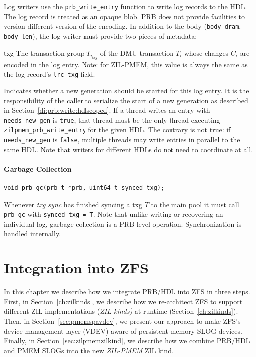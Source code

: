 \documentclass[12pt,a4paper,twoside]{book}
\begin{document}
Log writers use the \lstinline{prb_write_entry} function to write log records to the HDL.
The log record is treated as an opaque blob.
PRB does not provide facilities to version different version of the encoding.
In addition to the body (\lstinline{body_dram}, \lstinline{body_len}), the log writer must provide two pieces of metadata:
\begin{description}[noitemsep,leftmargin=1.5cm,labelindent=1cm]
    \item[txg] The transaction group $T_{i_{txg}}$ of the DMU transaction $T_i$ whose changes $C_i$ are encoded in the log entry.
        Note: for ZIL-PMEM, this value is always the same as the log record's \lstinline{lrc_txg} field.
    \item[needs\_new\_gen] Indicates whether a new generation should be started for this log entry.
        It is the responsibility of the caller to serialize the start of a new generation as described in Section~\ref{di:prb:write:hdlscoped}.
        If a thread writes an entry with \lstinline{needs_new_gen} is \lstinline{true}, that thread must be the only thread executing \lstinline{zilpmem_prb_write_entry} for the given HDL.
        The contrary is not true: if \lstinline{needs_new_gen} is \lstinline{false}, multiple threads may write entries in parallel to the same HDL.
        Note that writers for different HDLs do not need to coordinate at all.
\end{description}

\subsubsection{Garbage Collection}

\begin{lstlisting}
void prb_gc(prb_t *prb, uint64_t synced_txg);
\end{lstlisting}

Whenever \textit{txg sync} has finished syncing a txg $T$ to the main pool it must call \lstinline{prb_gc} with \lstinline{synced_txg = T}.
Note that unlike writing or recovering an individual log, garbage collection is a PRB-level operation.
Synchronization is handled internally.


\chapter{Integration into ZFS}\label{ch:zilpmem}
In this chapter we describe how we integrate PRB/HDL into ZFS in three steps.
First, in Section~\ref{ch:zilkinds}, we describe how we re-architect ZFS to support different ZIL implementations (\textit{ZIL kinds)} at runtime (Section~\ref{ch:zilkinds}).
Then, in Section~\ref{sec:pmemspavdev}, we present our approach to make ZFS's device management layer (VDEV) aware of persistent memory SLOG devices.
Finally, in Section~\ref{sec:zilpmemzilkind}, we describe how we combine PRB/HDL and PMEM SLOGs into the new \textit{ZIL-PMEM} ZIL kind.
\end{document}
